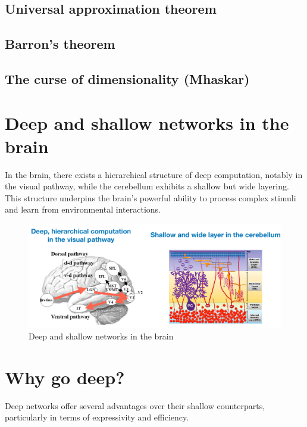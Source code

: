 \documentclass[11pt]{book} %
\begin{document}
%
%

\subsection{Universal approximation theorem}

%
%

\subsection{Barron's theorem}

%
%

\subsection{The curse of dimensionality (Mhaskar)}

%
%
%

\section{Deep and shallow networks in the brain}

In the brain, there exists a hierarchical structure of deep computation, notably in the visual pathway, while the cerebellum exhibits a shallow but wide layering. 
This structure underpins the brain's powerful ability to process complex stimuli and learn from environmental interactions.

\begin{figure}[ht]
    \centering
    \includegraphics[width=\textwidth]{./Figs/deep_and_shallow_brain.jpeg}
    \caption{Deep and shallow networks in the brain}
    \label{fig:brain_networks}
\end{figure}

\section{Why go deep?}
Deep networks offer several advantages over their shallow counterparts, particularly in terms of expressivity and efficiency.
\end{document}

